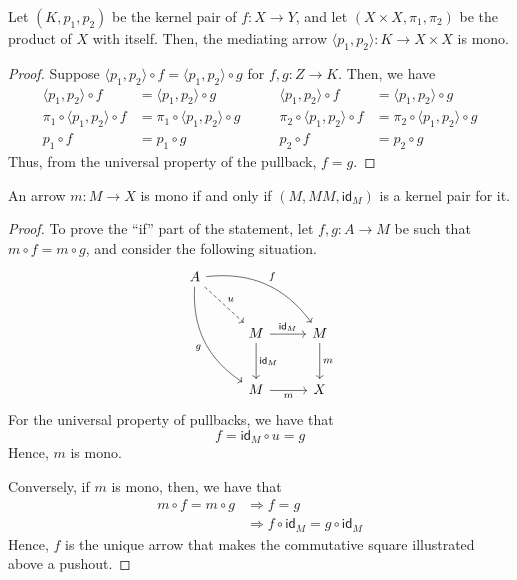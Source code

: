 \documentclass[runningheads,envcountsect]{llncs}
\newcommand{\id}[1]{\mathsf{id}_{#1}}
\begin{document}
\begin{proposition}\label{prop:pairng_of_kernel_pairs_mono}
    Let $(K, p_1, p_2)$ be the kernel pair of $f: X \to Y$, and let $(X\times X, \pi_1, \pi_2)$ be the product of $X$ with itself. Then, the mediating arrow $\langle p_1, p_2\rangle : K \to X \times X$ is mono.
\end{proposition}

\begin{proof}
	Suppose $\langle p_1, p_2 \rangle \circ f = \langle p_1, p_2 \rangle \circ g$ for $f, g: Z \to K$. Then, we have
	\[
		\begin{split}
			\langle p_1, p_2 \rangle \circ f &=  \langle p_1, p_2 \rangle \circ g \\
			\pi_1 \circ \langle p_1, p_2 \rangle \circ f &=  \pi_1 \circ \langle p_1, p_2 \rangle \circ g \\
			p_1 \circ f &= p_1 \circ g
		\end{split}
		\qquad
		\begin{split}
			\langle p_1, p_2 \rangle \circ f &=  \langle p_1, p_2 \rangle \circ g \\
			\pi_2 \circ \langle p_1, p_2 \rangle \circ f &=  \pi_2 \circ \langle p_1, p_2 \rangle \circ g \\
			p_2 \circ f &= p_2 \circ g
		\end{split}
	\]
	Thus, from the universal property of the pullback, $f = g$.
\end{proof}

\begin{proposition}\label{prop:kermono}
	An arrow $m\colon M\to X$ is mono if and only if $(M, MM, \id{M})$ is a kernel pair for it.
\end{proposition}

\begin{proof}
    To prove the ``if'' part of the statement, let $f, g: A \to M$ be such that $m\circ f = m\circ g$, and consider the following situation.
    \[
        \begin{tikzcd}[row sep=26, column sep = 26]
        A \arrow[drr, bend left=30, "f"] \arrow[ddr, bend right=30,"g" swap] \arrow[dr, dashed, "u"] & & \\
        & M  \arrow[d, "{\id{M}}"] \arrow[r, "{\id{M}}"] & M \arrow[d, "m"] \\
        & M  \arrow[r, "m" swap] & X
        \end{tikzcd}
    \]
    For the universal property of pullbacks, we have that $$f  =  \id{M} \circ u =  g$$
    Hence, $m$ is mono.

    Conversely, if $m$ is mono, then, we have that
    \begin{align*}
        m \circ f = m \circ g   &\Rightarrow    f = g \\
                                &\Rightarrow    f \circ \id{M} = g\circ \id{M}
    \end{align*}
    Hence, $f$ is the unique arrow that makes the commutative square illustrated above a pushout.
\end{proof}
\end{document}
